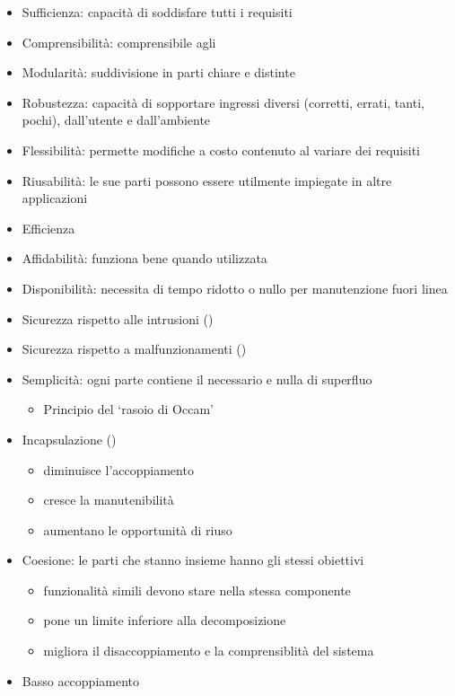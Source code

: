 \begin{itemize}
\begin{itemize}
  \item Sufficienza: capacità di soddisfare tutti i requisiti
  \item Comprensibilità: comprensibile agli 
  \item Modularità: suddivisione in parti chiare e distinte
  \item Robustezza: capacità di sopportare ingressi diversi (corretti, errati,
        tanti, pochi), dall'utente e dall'ambiente
  \item Flessibilità: permette modifiche a costo contenuto al variare dei
        requisiti
  \item Riusabilità: le sue parti possono essere utilmente impiegate in altre
        applicazioni
  \item Efficienza
  \item Affidabilità: funziona bene quando utilizzata
  \item Disponibilità: necessita di tempo ridotto o nullo per manutenzione fuori
        linea
  \item Sicurezza rispetto alle intrusioni ()
  \item Sicurezza rispetto a malfunzionamenti ()
  \item Semplicità: ogni parte contiene il necessario e nulla di superfluo
    \begin{itemize}
      \item Principio del `rasoio di Occam'
    \end{itemize}
  \item Incapsulazione ()
    \begin{itemize}
      \item diminuisce l'accoppiamento
      \item cresce la manutenibilità
      \item aumentano le opportunità di riuso
    \end{itemize}
  \item Coesione: le parti che stanno insieme hanno gli stessi obiettivi
    \begin{itemize}
      \item funzionalità simili devono stare nella stessa componente
      \item pone un limite inferiore alla decomposizione
      \item migliora il disaccoppiamento e la comprensiblità del sistema
    \end{itemize}
  \item Basso accoppiamento
\end{itemize}


\end{itemize}
